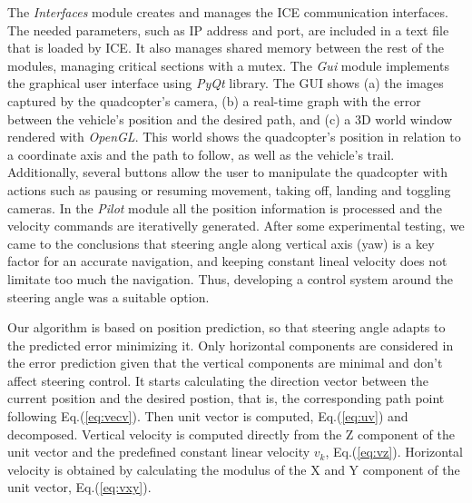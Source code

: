 \documentclass{styles/svproc}
\begin{document}
	The \textit{Interfaces} module creates and manages the ICE communication interfaces. The needed parameters, such as IP address and port, are included in a text file that is loaded by ICE. It also manages shared memory between the rest of the modules, managing critical sections with a mutex. 
%
The \textit{Gui} module implements the graphical user interface using \textit{PyQt} library. The GUI shows (a) the images captured by the quadcopter's camera, (b) a real-time graph with the error between the vehicle's position and the desired path, and (c) a 3D world window rendered with \textit{OpenGL}. This world shows the quadcopter's position in relation to a coordinate axis and the path to follow, as well as the vehicle's trail. Additionally, several buttons allow the user to manipulate the quadcopter with actions such as pausing or resuming movement, taking off, landing and toggling cameras. 
%
In the \textit{Pilot} module all the position information is processed and the velocity commands are iterativelly generated. 
After some experimental testing, we came to the conclusions that steering angle along vertical axis (yaw) is a key factor for an accurate navigation, and keeping constant lineal velocity does not limitate too much the navigation. %
Thus, developing a control system around the steering angle was a suitable option.

 Our algorithm is based on position prediction, so that steering angle adapts to the predicted error minimizing it. Only horizontal components are considered in the error prediction given that the vertical components are minimal and don't affect steering control. It starts calculating the direction vector between the current position and the desired postion, that is, the corresponding path point following Eq.(\ref{eq:vecv}). Then unit vector is computed, Eq.(\ref{eq:uv}) and 
decomposed. Vertical velocity is computed directly from the Z component of the unit vector and the predefined constant linear velocity $v_{k}$, Eq.(\ref{eq:vz}). Horizontal velocity is obtained by calculating the modulus of the X and Y component of the unit vector, Eq.(\ref{eq:vxy}).
\end{document}
